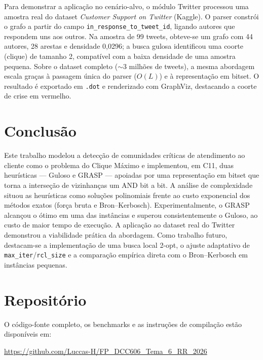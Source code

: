 \documentclass[12pt]{article}
\begin{document}
Para demonstrar a aplicação no cenário-alvo, o módulo Twitter processou uma
amostra real do dataset \emph{Customer Support on Twitter} (Kaggle). O parser
constrói o grafo a partir do campo \texttt{in\_response\_to\_tweet\_id},
ligando autores que respondem uns aos outros. Na amostra de 99 tweets, obteve-se
um grafo com 44 autores, 28 arestas e densidade 0{,}0296; a busca gulosa
identificou uma coorte (clique) de tamanho 2, compatível com a baixa densidade
de uma amostra pequena. Sobre o dataset completo ($\sim$3 milhões de tweets), a
mesma abordagem escala graças à passagem única do parser ($O(L)$) e à
representação em bitset. O resultado é exportado em \texttt{.dot} e renderizado
com GraphViz, destacando a coorte de crise em vermelho.

\section{Conclusão}

Este trabalho modelou a detecção de comunidades críticas de atendimento ao
cliente como o problema do Clique Máximo e implementou, em C11, duas heurísticas
--- Guloso e GRASP --- apoiadas por uma representação em bitset que torna a
interseção de vizinhanças um AND bit a bit. A análise de complexidade situou as
heurísticas como soluções polinomiais frente ao custo exponencial dos métodos
exatos (força bruta e Bron--Kerbosch). Experimentalmente, o GRASP alcançou o
ótimo em uma das instâncias e superou consistentemente o Guloso, ao custo de
maior tempo de execução. A aplicação ao dataset real do Twitter demonstrou a
viabilidade prática da abordagem. Como trabalho futuro, destacam-se a
implementação de uma busca local 2-opt, o ajuste adaptativo de
\texttt{max\_iter}/\texttt{rcl\_size} e a comparação empírica direta com o
Bron--Kerbosch em instâncias pequenas.

\section*{Repositório}

O código-fonte completo, os benchmarks e as instruções de compilação estão
disponíveis em:
\begin{center}
\url{https://github.com/Luccas-H/FP_DCC606_Tema_6_RR_2026}
\end{center}
\end{document}

